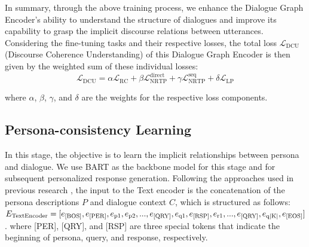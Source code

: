 \documentclass[letterpaper]{article} %
\begin{document}
In summary, through the above training process, we enhance the Dialogue Graph Encoder's ability to understand the structure of dialogues and improve its capability to grasp the implicit discourse relations between utterances. Considering the fine-tuning tasks and their respective losses, the total loss $\mathcal{L}_{\text{DCU}}$ (Discourse Coherence Understanding) of this Dialogue Graph Encoder is then given by the weighted sum of these individual losses:
\begin{equation}
    \mathcal{L}_{\text{DCU}} = \alpha \mathcal{L}_{\text{RC}} + \beta \mathcal{L}_{\text{NRTP}}^{\text{direct}} + \gamma \mathcal{L}_{\text{NRTP}}^{\text{seq}} + \delta \mathcal{L}_{\text{LP}}
\end{equation}

where \(\alpha\), \(\beta\), \(\gamma\), and \(\delta\) are the weights for the respective loss components.

\subsection{Persona-consistency Learning}
In this stage, the objective is to learn the implicit relationships between persona and dialogue. We use BART \cite{lewis-etal-2020-bart} as the backbone model for this stage and for subsequent personalized response generation. Following the approaches used in previous research \cite{chen-etal-2023-memorize}, the input to the Text encoder is the concatenation of the persona descriptions $P$ and dialogue context $C$, which is structured as follows: $E_{\text{TextEncoder}} = [e_{\text{[BOS]}}, e_{\text{[PER]}}, e_{\text{p1}}, e_{\text{p2}}, ... , e_{\text{[QRY]}}, e_{\text{q1}}, e_{\text{[RSP]}}, e_{\text{r1}}, ... , e_{\text{[QRY]}}, \\e_{\text{q}|\text{K}|}, e_{\text{[EOS]}}]$. where [PER], [QRY], and [RSP] are three special tokens that indicate the beginning of persona, query, and response, respectively.
\end{document}
